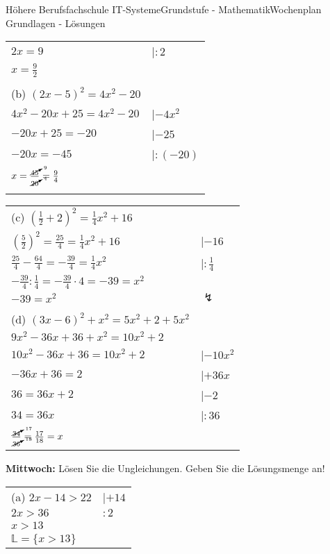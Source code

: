 \documentclass[oneside,openany,headings=optiontotoc,11pt,numbers=noenddot]{scrreprt}
\begin{document}
\begin{worksheet}{Höhere Berufsfachschule IT-Systeme}{Grundstufe - Mathematik}{Wochenplan Grundlagen - Lösungen}
\begin{framed}
\begin{tabularx}{\textwidth}{ll}
				\(2x = 9\) & |\(:2\)\\
				\(x = \frac{9}{2}\)\\
				\\
				(b) \((2x-5)^2 = 4x^2 -20\)\\
				\(4x^2 -20x +25 = 4x^2 -20\) &|\(-4x^2\)\\
				\(-20x+25 = -20\) & |\(-25\)\\
				\(-20x = -45\) & |\(:(-20)\)\\
				\(x = \frac{\cancelto{9}{45}}{\cancelto{4}{20}} = \frac{9}{4}\)\\
				\\
			\end{tabularx}
			\begin{tabularx}{\textwidth}{ll}
				(c) \((\frac{1}{2} + 2)^2 = \frac{1}{4}x^2 +16\)\\
				\((\frac{5}{2})^2 = \frac{25}{4} = \frac{1}{4}x^2 + 16\) & |\(-16\)\\
				\(\frac{25}{4} - \frac{64}{4} = -\frac{39}{4} = \frac{1}{4}x^2\) & |\(:\frac{1}{4}\)\\
				\(-\frac{39}{4}:\frac{1}{4} = -\frac{39}{4}\cdot{}4 = -39 = x^2\)\\
				\(-39 = x^2\) & \(\lightning\)\\
				\\
				(d) \((3x-6)^2 + x^2 = 5x^2 +2 +5x^2\)\\
				\(9x^2 -36x +36 + x^2 = 10x^2 + 2\)\\
				\(10x^2 -36x +36 = 10x^2 + 2\) & |\(-10x^2\)\\
				\(-36x + 36 = 2\) & |\(+36x\)\\
				\(36 = 36x + 2\) & |\(-2\)\\
				\(34 = 36x\) & |\(:36\)\\
				\(\frac{\cancelto{17}{34}}{\cancelto{18}{36}} = \frac{17}{18} = x\)\\
			\end{tabularx}
		\end{framed}
		\begin{framed}
			\noindent
			\textbf{Mittwoch:} Lösen Sie die Ungleichungen. Geben Sie die Lösungsmenge an!\\
			\begin{tabularx}{\textwidth}{ll}
				(a) \(2x -14 > 22\) & |\(+14\)\\
				\(2x > 36\) & \(:2\)\\
				\(x > 13\)\\
				\(\mathbb{L} = \{x>13\}\)\\

\end{tabularx}
\end{framed}
\end{worksheet}
\end{document}
